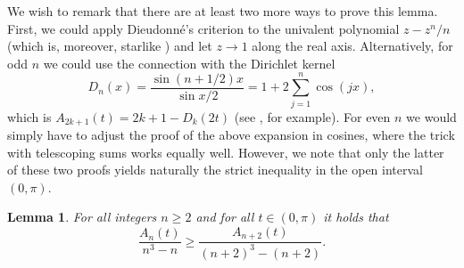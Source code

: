 \documentclass[11pt,reqno]{amsart}
\theoremstyle{plain}
\newtheorem{lemma}[theorem]{Lemma}
\theoremstyle{definition}
\theoremstyle{remark}
\newcommand{\be}{\begin{equation}}
\newcommand{\ee}{\end{equation}}
\begin{document}
\vskip0.2cm
We wish to remark that there are at least two more ways to prove this lemma. First, we could apply Dieudonn\'e's criterion to the univalent polynomial $z-z^n/n$ (which is, moreover, starlike \cite[Thm.~2.3]{Br}) and let $z\to 1$ along the real axis. Alternatively, for odd $n$ we could use the connection with the Dirichlet kernel 
$$
D_n(x) = \frac{\sin(n+1/2)x}{\sin x/2} = 1+2\sum_{j=1}^n \cos(jx),
$$
which is $A_{2k+1}(t) = 2k+1-D_k(2t)$ (see \cite[\S 8.4]{Du4}, for example). For even $n$ we would simply have to adjust the proof of the above expansion in cosines, where the trick with telescoping sums works equally well. However, we note that only the latter of these two proofs yields naturally the strict inequality in the open interval $(0,\pi)$. 

\begin{lemma} \label{lem+2}
For all integers $n\geq 2$ and for all $t\in (0,\pi)$ it holds that 
\be \label{ind}
\frac{A_n(t)}{n^3-n} \geq \frac{A_{n+2}(t)}{(n+2)^3-(n+2)}.
\ee
\end{lemma}
\vskip0.2cm
\end{document}
